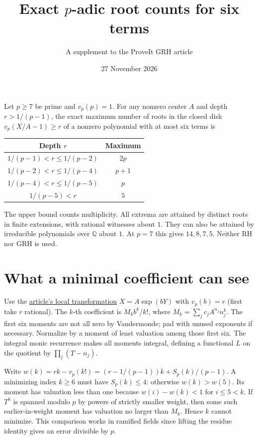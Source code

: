 \documentclass[11pt]{article}
\title{\vspace{-1.6em}Exact \(p\)-adic root counts for six terms}
\author{A supplement to the ProveIt GRH article}
\date{27 November 2026}
\begin{document}
\maketitle
Let \(p\ge7\) be prime and \(v_p(p)=1\). For any nonzero center \(A\)
and depth \(r>1/(p-1)\), the exact maximum number of roots in the
closed disk \(v_p(X/A-1)\ge r\) of a nonzero polynomial with at most
six terms is
\begin{center}
\begin{tabular}{cc}
\toprule
Depth \(r\) & Maximum\\
\midrule
\(1/(p-1)<r\le1/(p-2)\) & \(2p\)\\
\(1/(p-2)<r\le1/(p-4)\) & \(p+1\)\\
\(1/(p-4)<r\le1/(p-5)\) & \(p\)\\
\(1/(p-5)<r\) & \(5\)\\
\bottomrule
\end{tabular}
\end{center}
The upper bound counts multiplicity. All extrema are attained by
distinct roots in finite extensions, with rational witnesses
about \(1\). They can also be attained by irreducible polynomials
over \(\mathbb Q\) about \(1\). At \(p=7\) this gives \(14,8,7,5\).
Neither RH nor GRH is used.

\section{What a minimal coefficient can see}
Use the \href{https://github.com/VladimirReshetnikov/ProveIt/blob/dd990b27a22290c756c1bd4adce1d971bf7e7821/Analysis/GeneralizedRiemannHypothesis/Article/sections/smd.tex#L57}{article's local transformation}
\(X=A\exp(bY)\) with \(v_p(b)=r\) (first take \(r\) rational).
The \(k\)-th coefficient is \(M_k b^k/k!\), where
\(M_k=\sum_j c_j A^{n_j}n_j^k\). The first six moments are not
all zero by Vandermonde; pad with unused exponents if necessary.
Normalize by a moment of least valuation among those first six.
The integral monic recurrence makes all moments integral, defining a
functional \(L\) on the quotient by \(\prod_j(T-n_j)\).

Write \(w(k)=rk-v_p(k!)=(r-1/(p-1))k+S_p(k)/(p-1)\).
A minimizing index \(k\ge6\) must have \(S_p(k)\le4\):
otherwise \(w(k)>w(5)\). Its moment has valuation less than one
because \(w(i)-w(k)<1\) for \(i\le5<k\).
If \(T^k\) is spanned modulo \(p\) by powers of strictly smaller
weight, then some such earlier-in-weight moment has valuation no
larger than \(M_k\). Hence \(k\) cannot minimize. This comparison
works in ramified fields since lifting the residue identity gives
an error divisible by \(p\).
\end{document}
